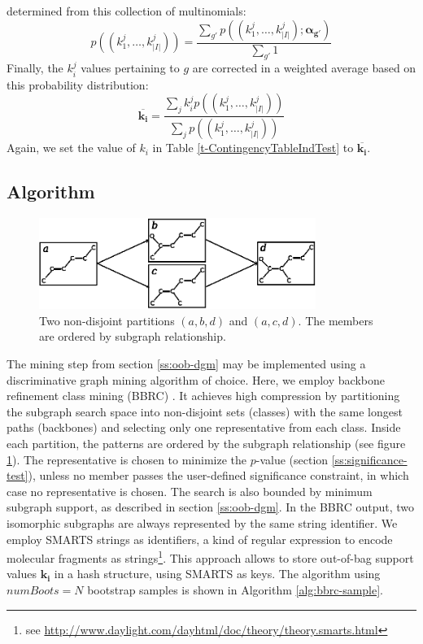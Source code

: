 \documentclass{sig-alternate}
\begin{document}
determined from this collection of multinomials:
\begin{equation}
  p((k_1^j,\ldots,k_{\vert I\vert}^j))=\frac{\sum_{g'} p((k_1^j,\ldots,k_{\vert I\vert}^j); \mathbf{\alpha_{g'}})}{\sum_{g'}1}
  \label{eqn:avgpr}
\end{equation}
Finally, the $k_i^j$ values pertaining to $g$ are corrected in a weighted average
based on this probability distribution:
\begin{equation}
  \overline{\mathbf{k_i}}=\frac{\sum_j k_i^j p((k_1^j,\ldots,k_{\vert I\vert}^j))}{\sum_j p((k_1^j,\ldots,k_{\vert I\vert}^j))}
  \label{eqn:avgki}
\end{equation}
Again, we set the value of $k_i$ in Table \ref{t-ContingencyTableIndTest} to $\overline{\mathbf{k_i}}$.

\subsection{Algorithm}
\label{s:Algorithm}
\begin{figure}[t]
  \begin{center}
    \includegraphics[width=9cm]{classes.eps}
  \end{center}
  \caption{Two non-disjoint partitions $(a,b,d)$ and $(a,c,d)$. The members are ordered by subgraph relationship.}
  \label{fig:bbrc}
\end{figure}
The mining step from section \ref{ss:oob-dgm} may be 
implemented using a discriminative graph mining algorithm of choice. Here, we
employ backbone refinement class mining (BBRC) \cite{maunz11efficient}. It
achieves high compression by partitioning the subgraph search space into non-disjoint sets (classes) with the same
longest paths (backbones) and selecting only one representative from each
class. Inside each partition, the patterns are ordered by the subgraph relationship (see figure \ref{fig:bbrc}). 
The representative is chosen to minimize the $p$-value (section \ref{ss:significance-test}), unless no member passes the user-defined significance constraint, in which case no representative is chosen.
The search is also bounded by minimum subgraph support, as described in section \ref{ss:oob-dgm}.
In the BBRC output, two isomorphic subgraphs are always represented by the same string identifier.
We employ SMARTS strings as identifiers, a kind of regular expression to encode
molecular fragments as strings\footnote{see \url{http://www.daylight.com/dayhtml/doc/theory/theory.smarts.html}}.  This approach allows to store out-of-bag support values $\mathbf{k_i}$ in a
hash structure, using SMARTS as keys. The algorithm using $numBoots=N$ bootstrap samples is shown in Algorithm
\ref{alg:bbrc-sample}.
\end{document}
